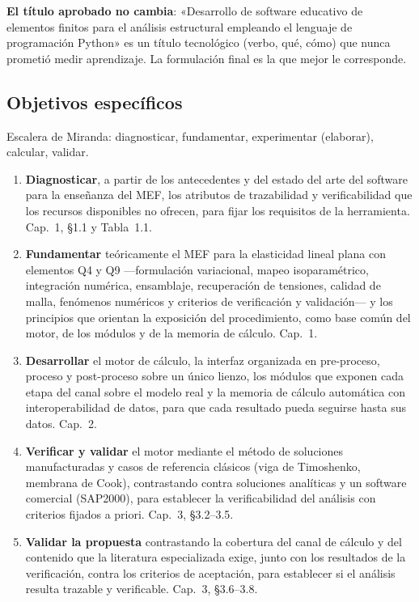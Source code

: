 \documentclass[11pt,a4paper]{article}
\newcommand{\molde}[1]{\textcolor{blue!60!black}{\small #1}}
\begin{document}
\textbf{El título aprobado no cambia}: «Desarrollo de software educativo de elementos finitos para el análisis estructural empleando el lenguaje de programación Python» es un título tecnológico (verbo, qué, cómo) que nunca prometió medir aprendizaje. La formulación final es la que mejor le corresponde.

\subsection{Objetivos específicos}

\molde{Escalera de Miranda: diagnosticar, fundamentar, experimentar (elaborar), calcular, validar.}

\begin{enumerate}
\item \textbf{Diagnosticar}, a partir de los antecedentes y del estado del arte del software para la enseñanza del MEF, los atributos de trazabilidad y verificabilidad que los recursos disponibles no ofrecen, para fijar los requisitos de la herramienta. \molde{Cap.~1, §1.1 y Tabla~1.1.}
\item \textbf{Fundamentar} teóricamente el MEF para la elasticidad lineal plana con elementos Q4 y Q9 —formulación variacional, mapeo isoparamétrico, integración numérica, ensamblaje, recuperación de tensiones, calidad de malla, fenómenos numéricos y criterios de verificación y validación— y los principios que orientan la exposición del procedimiento, como base común del motor, de los módulos y de la memoria de cálculo. \molde{Cap.~1.}
\item \textbf{Desarrollar} el motor de cálculo, la interfaz organizada en pre-proceso, proceso y post-proceso sobre un único lienzo, los módulos que exponen cada etapa del canal sobre el modelo real y la memoria de cálculo automática con interoperabilidad de datos, para que cada resultado pueda seguirse hasta sus datos. \molde{Cap.~2.}
\item \textbf{Verificar y validar} el motor mediante el método de soluciones manufacturadas y casos de referencia clásicos (viga de Timoshenko, membrana de Cook), contrastando contra soluciones analíticas y un software comercial (SAP2000), para establecer la verificabilidad del análisis con criterios fijados a priori. \molde{Cap.~3, §3.2--3.5.}
\item \textbf{Validar la propuesta} contrastando la cobertura del canal de cálculo y del contenido que la literatura especializada exige, junto con los resultados de la verificación, contra los criterios de aceptación, para establecer si el análisis resulta trazable y verificable. \molde{Cap.~3, §3.6--3.8.}
\end{enumerate}
\end{document}
